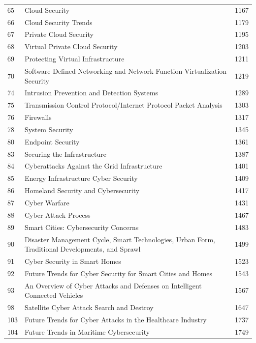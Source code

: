 \documentclass[10pt,letterpaper,oneside]{article}
\begin{document}
\begin{longtable}{@{}p{}p{}p{}@{}}
65 & Cloud Security & 1167 \\
66 & Cloud Security Trends & 1179 \\
67 & Private Cloud Security & 1195 \\
68 & Virtual Private Cloud Security & 1203 \\
69 & Protecting Virtual Infrastructure & 1211 \\
70 & Software-Defined Networking and Network Function Virtualization Security & 1219 \\
74 & Intrusion Prevention and Detection Systems & 1289 \\
75 & Transmission Control Protocol/Internet Protocol Packet Analysis & 1303 \\
76 & Firewalls & 1317 \\
78 & System Security & 1345 \\
80 & Endpoint Security & 1361 \\
83 & Securing the Infrastructure & 1387 \\
84 & Cyberattacks Against the Grid Infrastructure & 1401 \\
85 & Energy Infrastructure Cyber Security & 1409 \\
86 & Homeland Security and Cybersecurity & 1417 \\
87 & Cyber Warfare & 1431 \\
88 & Cyber Attack Process & 1467 \\
89 & Smart Cities: Cybersecurity Concerns & 1483 \\
90 & Disaster Management Cycle, Smart Technologies, Urban Form, Traditional Developments, and Sprawl & 1499 \\
91 & Cyber Security in Smart Homes & 1523 \\
92 & Future Trends for Cyber Security for Smart Cities and Homes & 1543 \\
93 & An Overview of Cyber Attacks and Defenses on Intelligent Connected Vehicles & 1567 \\
98 & Satellite Cyber Attack Search and Destroy & 1647 \\
103 & Future Trends for Cyber Attacks in the Healthcare Industry & 1737 \\
104 & Future Trends in Maritime Cybersecurity & 1749 \\
\bottomrule\end{longtable}\par\medskip
\end{document}
